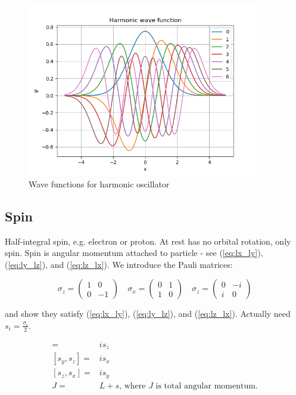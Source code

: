 \documentclass[]{article}
\begin{document}
\begin{figure}[H]
	\caption{Wave functions for harmonic oscillator}\label{fig:wave:harmonic}
	\includegraphics[width=0.9\textwidth]{harmonic_wavefunction}
\end{figure}

\subsection{Spin}

Half-integral spin, e.g. electron or proton. At rest has no orbital rotation, only spin. Spin is angular momentum attached to particle - see (\ref{eq:lx_ly}), (\ref{eq:ly_lz}), and (\ref{eq:lz_lx}). We introduce the Pauli matrices:

$$
\sigma_z = \begin{pmatrix}
1 & 0 \\
0 & -1
\end{pmatrix}
\quad
\sigma_x = \begin{pmatrix}
0 & 1 \\
1 & 0
\end{pmatrix}
\quad
\sigma_z = \begin{pmatrix}
0 & -i \\
i & 0
\end{pmatrix}
$$

and show they satisfy (\ref{eq:lx_ly}), (\ref{eq:ly_lz}), and (\ref{eq:lz_lx}). Actually need $s_i=\frac{\sigma_i}{2}$.

\begin{align*}
[s_x,s_y] =& i s_z \\
[s_y,s_z] =& i s_x\\
[s_z,s_x] =& i s_y\\
J=&L+s\text{, where $J$ is total angular momentum.}
\end{align*}
\end{document}
